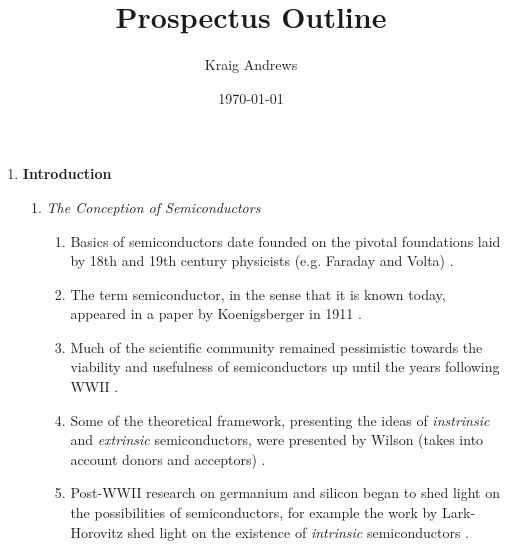 \documentclass{article}
\author{Kraig Andrews}
\title{Prospectus Outline}
\date{\today}
\begin{document}
\maketitle

\begin{enumerate}%

	\item{\textbf{Introduction}}
	\begin{enumerate}%
		\item{\emph{The Conception of Semiconductors}}
		\begin{enumerate}%
			\item{Basics of semiconductors date founded on the pivotal foundations laid by 18th and 19th century physicists (e.g. Faraday and Volta) \cite{Busch_EuroJournPhys1989,Faraday_Royal1833, Volta_Royal1782}.}
			\item{The term semiconductor, in the sense that it is known today, appeared in a paper by Koenigsberger in 1911 \cite{Koenigsberger_AnnalenDerPhysik1911}.}
			\item{Much of the scientific community remained pessimistic towards the viability and usefulness of semiconductors up until the years following WWII \cite{Busch_EuroJournPhys1989}.}
			\item{Some of the theoretical framework, presenting the ideas of \emph{instrinsic} and \emph{extrinsic} semiconductors, were presented by Wilson (takes into account donors and acceptors) \cite{Wilson_Royal1931a, Wilson_Royal1931b}.}
			\item{Post-WWII research on germanium and silicon began to shed light on the possibilities of semiconductors, for example the work by Lark-Horovitz shed light on the existence of \emph{intrinsic} semiconductors \cite{Lark_AAAS1954, Busch_EuroJournPhys1989}.}
		\end{enumerate}%
		

\end{enumerate}
\end{enumerate}
\end{document}
